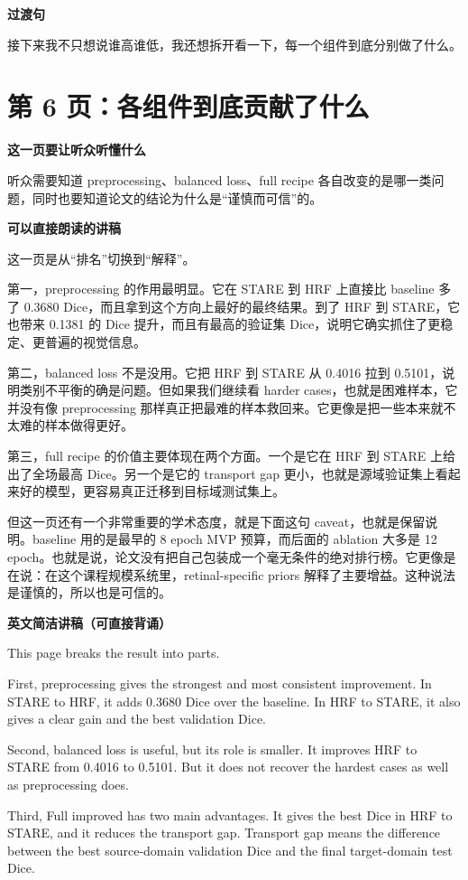 \documentclass[12pt,a4paper]{ctexart}
\newcommand{\EnglishScriptHeading}{\textbf{\color{AccentGreen}英文简洁讲稿（可直接背诵）}}
\begin{document}
\textbf{过渡句}

接下来我不只想说谁高谁低，我还想拆开看一下，每一个组件到底分别做了什么。

\section*{第 6 页：各组件到底贡献了什么}

\textbf{这一页要让听众听懂什么}

听众需要知道 preprocessing、balanced loss、full recipe 各自改变的是哪一类问题，同时也要知道论文的结论为什么是“谨慎而可信”的。

\textbf{可以直接朗读的讲稿}

这一页是从“排名”切换到“解释”。

第一，preprocessing 的作用最明显。它在 STARE 到 HRF 上直接比 baseline 多了 0.3680 Dice，而且拿到这个方向上最好的最终结果。到了 HRF 到 STARE，它也带来 0.1381 的 Dice 提升，而且有最高的验证集 Dice，说明它确实抓住了更稳定、更普遍的视觉信息。

第二，balanced loss 不是没用。它把 HRF 到 STARE 从 0.4016 拉到 0.5101，说明类别不平衡的确是问题。但如果我们继续看 harder cases，也就是困难样本，它并没有像 preprocessing 那样真正把最难的样本救回来。它更像是把一些本来就不太难的样本做得更好。

第三，full recipe 的价值主要体现在两个方面。一个是它在 HRF 到 STARE 上给出了全场最高 Dice。另一个是它的 transport gap 更小，也就是源域验证集上看起来好的模型，更容易真正迁移到目标域测试集上。

但这一页还有一个非常重要的学术态度，就是下面这句 caveat，也就是保留说明。baseline 用的是最早的 8 epoch MVP 预算，而后面的 ablation 大多是 12 epoch。也就是说，论文没有把自己包装成一个毫无条件的绝对排行榜。它更像是在说：在这个课程规模系统里，retinal-specific priors 解释了主要增益。这种说法是谨慎的，所以也是可信的。

\EnglishScriptHeading

This page breaks the result into parts.

First, preprocessing gives the strongest and most consistent improvement. In STARE to HRF, it adds 0.3680 Dice over the baseline. In HRF to STARE, it also gives a clear gain and the best validation Dice.

Second, balanced loss is useful, but its role is smaller. It improves HRF to STARE from 0.4016 to 0.5101. But it does not recover the hardest cases as well as preprocessing does.

Third, Full improved has two main advantages. It gives the best Dice in HRF to STARE, and it reduces the transport gap. Transport gap means the difference between the best source-domain validation Dice and the final target-domain test Dice.
\end{document}
